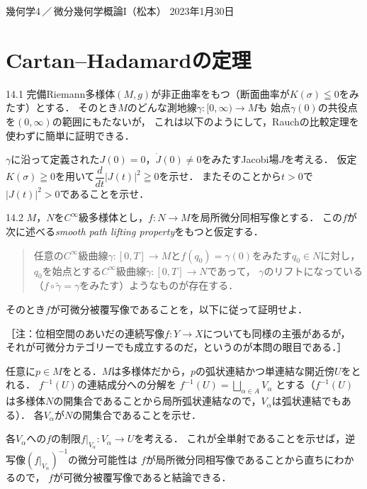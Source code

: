 \documentclass[uplatex,dvipdfmx,fontsize=12pt,jafontsize=11pt,line_length=42zw,number_of_lines=36,hanging_punctuation]{jlreq}
\newcommand{\abs}[1]{\lvert#1\rvert}
\begin{document}
\begin{flushleft}
	幾何学4\,／\,微分幾何学概論I（松本）
	\hfill
	2023年1月30日
\end{flushleft}
\setcounter{section}{13}
\section{Cartan--Hadamardの定理}

\begin{enumerate-problems}
	\item[14.1]
		完備Riemann多様体$(M,g)$が非正曲率をもつ（断面曲率が$K(\sigma)\leqq 0$をみたす）とする．
		そのとき$M$のどんな測地線$\gamma\colon[0,\infty)\to M$も
		始点$\gamma(0)$の共役点を$(0,\infty)$の範囲にもたないが，
		これは以下のようにして，Rauchの比較定理を使わずに簡単に証明できる．

		$\gamma$に沿って定義された$J(0)=0$，$\dot{J}(0)\not=0$をみたすJacobi場$J$を考える．
		仮定$K(\sigma)\geqq 0$を用いて$\dfrac{d}{dt}\abs{J(t)}^2\geqq 0$を示せ．
		またそのことから$t>0$で$\abs{J(t)}^2>0$であることを示せ．
	\item[14.2]
		$M$，$N$を$C^\infty$級多様体とし，$f\colon N\to M$を局所微分同相写像とする．
		この$f$が次に述べる\emph{smooth path lifting property}をもつと仮定する．
		\begin{quote}
			任意の$C^\infty$級曲線$\gamma\colon[0,T]\to M$と$f(q_0)=\gamma(0)$をみたす$q_0\in N$に対し，
			$q_0$を始点とする$C^\infty$級曲線$\tilde{\gamma}\colon[0,T]\to N$であって，
			$\gamma$のリフトになっている（$f\circ\tilde{\gamma}=\gamma$をみたす）ようなものが存在する．
		\end{quote}
		そのとき$f$が可微分被覆写像であることを，以下に従って証明せよ．

		［注：位相空間のあいだの連続写像$f\colon Y\to X$についても同様の主張があるが，
		それが可微分カテゴリーでも成立するのだ，というのが本問の眼目である．］

		\begin{enumerate-subproblems}
			\item
				任意に$p\in M$をとる．$M$は多様体だから，$p$の弧状連結かつ単連結な開近傍$U$をとれる．
				$f^{-1}(U)$の連結成分への分解を
				$f^{-1}(U)=\bigsqcup_{\alpha\in A}V_\alpha$
				とする（$f^{-1}(U)$は多様体$N$の開集合であることから局所弧状連結なので，$V_\alpha$は弧状連結でもある）．
				各$V_\alpha$が$N$の開集合であることを示せ．
			\item
				各$V_\alpha$への$f$の制限$f|_{V_\alpha}\colon V_\alpha\to U$を考える．
				これが全単射であることを示せば，逆写像$(f|_{V_\alpha})^{-1}$の微分可能性は
				$f$が局所微分同相写像であることから直ちにわかるので，
				$f$が可微分被覆写像であると結論できる．


\end{enumerate-subproblems}
\end{enumerate-problems}
\end{document}
